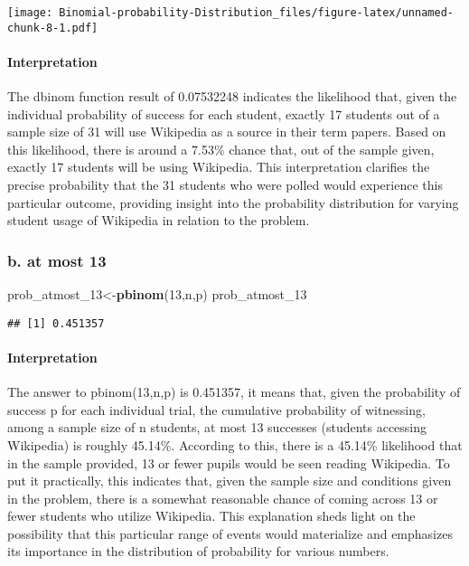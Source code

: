 \documentclass[
]{article}
\newenvironment{Shaded}{\begin{snugshade}}{\end{snugshade}}
\newcommand{\DecValTok}[1]{\textcolor[rgb]{0.00,0.00,0.81}{#1}}
\newcommand{\FunctionTok}[1]{\textcolor[rgb]{0.13,0.29,0.53}{\textbf{#1}}}
\newcommand{\NormalTok}[1]{#1}
\newcommand{\OtherTok}[1]{\textcolor[rgb]{0.56,0.35,0.01}{#1}}
\begin{document}
\texttt{[image: Binomial-probability-Distribution\_files/figure-latex/unnamed-chunk-8-1.pdf]}

\paragraph{Interpretation}\label{interpretation-4}

The dbinom function result of 0.07532248 indicates the likelihood that,
given the individual probability of success for each student, exactly 17
students out of a sample size of 31 will use Wikipedia as a source in
their term papers. Based on this likelihood, there is around a 7.53\%
chance that, out of the sample given, exactly 17 students will be using
Wikipedia. This interpretation clarifies the precise probability that
the 31 students who were polled would experience this particular
outcome, providing insight into the probability distribution for varying
student usage of Wikipedia in relation to the problem.

\subsubsection{b. at most 13}\label{b.-at-most-13}

\begin{Shaded}
\begin{Highlighting}[]
\NormalTok{prob\_atmost\_13}\OtherTok{\textless{}{-}}\FunctionTok{pbinom}\NormalTok{(}\DecValTok{13}\NormalTok{,n,p)}
\NormalTok{prob\_atmost\_13}
\end{Highlighting}
\end{Shaded}

\begin{verbatim}
## [1] 0.451357
\end{verbatim}

\paragraph{Interpretation}\label{interpretation-5}

The answer to pbinom(13,n,p) is 0.451357, it means that, given the
probability of success p for each individual trial, the cumulative
probability of witnessing, among a sample size of n students, at most 13
successes (students accessing Wikipedia) is roughly 45.14\%. According
to this, there is a 45.14\% likelihood that in the sample provided, 13
or fewer pupils would be seen reading Wikipedia. To put it practically,
this indicates that, given the sample size and conditions given in the
problem, there is a somewhat reasonable chance of coming across 13 or
fewer students who utilize Wikipedia. This explanation sheds light on
the possibility that this particular range of events would materialize
and emphasizes its importance in the distribution of probability for
various numbers.
\end{document}

